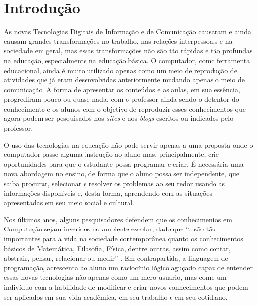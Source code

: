\documentclass[12pt, openright, a4paper, brazil, english, french, spanish, bibjustif, openany, oneside]{abntex2}
\begin{document}
\tableofcontents*
\cleardoublepage
\textual


\chapter{Introdução}

As novas Tecnologias Digitais de Informação e de Comunicação causaram e ainda causam grandes transformações no trabalho, nas relações interpessoais e na sociedade em geral, mas essas transformações não são tão rápidas e tão profundas na educação, especialmente na educação básica. O computador, como ferramenta educacional, ainda é muito utilizado apenas como um meio de reprodução de atividades que já eram desenvolvidas anteriormente mudando apenas o meio de comunicação. A forma de apresentar os conteúdos e as aulas, em sua essência, progrediram pouco ou quase nada, com o professor ainda sendo o detentor do conhecimento e os alunos com o objetivo de reproduzir esses conhecimentos que agora podem ser pesquisados nos \textit{sites} e nos \textit{blogs} escritos ou indicados pelo professor.


O uso das tecnologias na educação não pode servir apenas a uma proposta onde o computador passe alguma instrução ao aluno mas, principalmente, crie oportunidades para que o estudante possa programar e criar. É necessária uma nova abordagem no ensino, de forma que o aluno possa ser independente, que saiba procurar, selecionar e resolver os problemas ao seu redor usando as informações disponíveis e, desta forma, aprendendo com as situações apresentadas em seu meio social e cultural. 

Nos últimos anos, alguns pesquisadores defendem que os conhecimentos em Computação sejam inseridos no ambiente escolar, dado que ``...são tão importantes para a vida na sociedade contemporânea quanto os conhecimentos básicos de Matemática, Filosofia, Física, dentre outras, assim como contar, abstrair, pensar, relacionar ou medir'' \cite{brac}. Em contrapartida, a linguagem de programação, acrescenta ao aluno um raciocínio lógico aguçado capaz de entender essas novas tecnologias não apenas como um mero usuário, mas como um indivíduo com a habilidade de modificar e criar novos conhecimentos que podem ser aplicados em sua vida acadêmica, em seu trabalho e em seu cotidiano.
\end{document}
